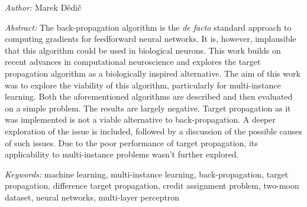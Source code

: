 \bigskip

\noindent \textit{Author:} Marek Dědič

\bigskip

\noindent \textit{Abstract:}
The back-propagation algorithm is the \textit{de facto} standard approach to computing gradients for feedforward neural networks. It is, however, implausible that this algorithm could be used in biological neurons. This work builds on recent advances in computational neuroscience and explores the target propagation algorithm as a biologically inspired alternative. The aim of this work was to explore the viability of this algorithm, particularly for multi-instance learning. Both the aforementioned algorithms are described and then evaluated on a simple problem. The results are largely negative. Target propagation as it was implemented is not a viable alternative to back-propagation. A deeper exploration of the issue is included, followed by a discussion of the possible causes of such issues. Due to the poor performance of target propagation, its applicability to multi-instance problems wasn't further explored.

\bigskip

\noindent \textit{Keywords:}
machine learning, multi-instance learning, back-propagation, target propagation, difference target propagation, credit assignment problem, two-moon dataset, neural networks, multi-layer perceptron

